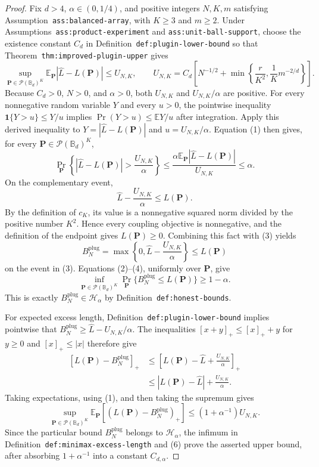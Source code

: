 \documentclass{article}
\begin{document}
\begin{proof}
Fix \(d>4\), \(\alpha\in(0,1/4)\), and positive integers \(N,K,m\) satisfying Assumption~\texttt{ass:balanced-array}, with \(K\ge3\) and \(m\ge2\).  Under Assumptions~\texttt{ass:product-experiment} and \texttt{ass:unit-ball-support}, choose the existence constant \(C_d\) in Definition~\texttt{def:plugin-lower-bound} so that Theorem~\texttt{thm:improved-plugin-upper} gives
\[
\sup_{\mathbf P\in\mathcal P(\mathbb B_d)^K}
\mathbb E_{\mathbf P}|\widehat L-L(\mathbf P)|
\le U_{N,K},
\qquad
U_{N,K}=C_d\left[N^{-1/2}+
\min\left\{\frac r{K^2},\frac1K m^{-2/d}\right\}\right].
\tag{1}
\]
Because \(C_d>0\), \(N>0\), and \(\alpha>0\), both \(U_{N,K}\) and \(U_{N,K}/\alpha\) are positive.  For every nonnegative random variable \(Y\) and every \(u>0\), the pointwise inequality \(\mathbf 1\{Y>u\}\le Y/u\) implies \(\Pr(Y>u)\le\mathbb EY/u\) after integration.  Apply this derived inequality to \(Y=|\widehat L-L(\mathbf P)|\) and \(u=U_{N,K}/\alpha\).  Equation (1) then gives, for every \(\mathbf P\in\mathcal P(\mathbb B_d)^K\),
\[
\Pr_{\mathbf P}\left\{|\widehat L-L(\mathbf P)|>
\frac{U_{N,K}}\alpha\right\}
\le\frac{\alpha\mathbb E_{\mathbf P}|\widehat L-L(\mathbf P)|}{U_{N,K}}
\le\alpha.
\tag{2}
\]
On the complementary event,
\[
\widehat L-\frac{U_{N,K}}\alpha\le L(\mathbf P).
\tag{3}
\]
By the definition of \(c_K\), its value is a nonnegative squared norm divided by the positive number \(K^2\).  Hence every coupling objective is nonnegative, and the definition of the endpoint gives \(L(\mathbf P)\ge0\).  Combining this fact with (3) yields
\[
B_N^{\mathrm{plug}}
=\max\left\{0,\widehat L-\frac{U_{N,K}}\alpha\right\}
\le L(\mathbf P)
\tag{4}
\]
on the event in (3).  Equations (2)--(4), uniformly over \(\mathbf P\), give
\[
\inf_{\mathbf P\in\mathcal P(\mathbb B_d)^K}
\Pr_{\mathbf P}\{B_N^{\mathrm{plug}}\le L(\mathbf P)\}
\ge1-\alpha.
\]
This is exactly \(B_N^{\mathrm{plug}}\in\mathcal H_\alpha\) by Definition~\texttt{def:honest-bounds}.

For expected excess length, Definition~\texttt{def:plugin-lower-bound} implies pointwise that \(B_N^{\mathrm{plug}}\ge\widehat L-U_{N,K}/\alpha\).  The inequalities \([x+y]_+\le[x]_++y\) for \(y\ge0\) and \([x]_+\le|x|\) therefore give
\[
\begin{aligned}
[L(\mathbf P)-B_N^{\mathrm{plug}}]_+
&\le\left[L(\mathbf P)-\widehat L+\frac{U_{N,K}}\alpha\right]_+\\
&\le|L(\mathbf P)-\widehat L|+\frac{U_{N,K}}\alpha.
\end{aligned}
\tag{5}
\]
Taking expectations, using (1), and then taking the supremum gives
\[
\sup_{\mathbf P\in\mathcal P(\mathbb B_d)^K}
\mathbb E_{\mathbf P}\!\left[(L(\mathbf P)-B_N^{\mathrm{plug}})_+\right]
\le(1+\alpha^{-1})U_{N,K}.
\tag{6}
\]
Since the particular bound \(B_N^{\mathrm{plug}}\) belongs to \(\mathcal H_\alpha\), the infimum in Definition~\texttt{def:minimax-excess-length} and (6) prove the asserted upper bound, after absorbing \(1+\alpha^{-1}\) into a constant \(C_{d,\alpha}\).


\end{proof}
\end{document}
